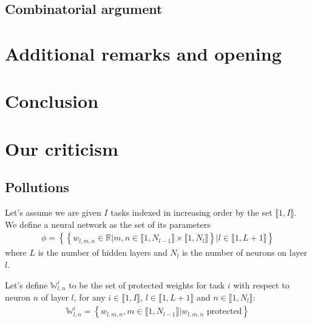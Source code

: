\documentclass[11pt]{article}
\newcommand{\intset}[2]{\llbracket #1, #2 \rrbracket}
\begin{document}
\subsection{Combinatorial argument}







\section{Additional remarks and opening}



\section{Conclusion}



\section{Our criticism}



\subsection{Pollutions}






\vspace{1mm}
\noindent
Let's assume we are given $I$ tasks indexed in increasing order by the set $\intset{1}{I}$. We define a neural network as the set of its parameters
\begin{align}
    \phi = \left\{\left\{ w_{l,m,n} \in \mathbb{R} | m,n \in \llbracket 1, N_{l-1} \rrbracket \times \llbracket 1, N_{l} \rrbracket \right\} | l \in \llbracket 1, L+1 \rrbracket \right\}
\end{align}
where $L$ is the number of hidden layers and $N_l$ is the number of neurons on layer $l$.

\vspace{1mm}
\noindent
Let's define $\mathbb{W}_{l,n}^i$ to be the set of protected weights for task $i$ with respect to neuron $n$ of layer $l$, for any $i \in \intset{1}{I}$, $l \in \intset{1}{L+1}$ and $n \in \intset{1}{N_l}$:
\begin{align}
    \mathbb{W}_{l,n}^i = \left\{ w_{l,m,n}, m \in \intset{1}{N_{l-1}} | w_{l,m,n} \text{ protected} \right\}
\end{align}
\end{document}
